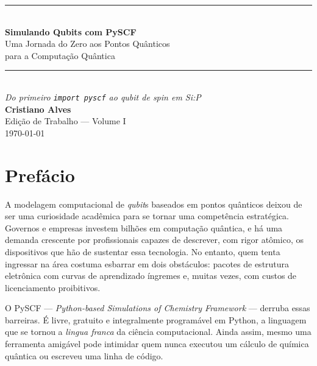 \documentclass[11pt,a4paper,openany]{book}
\newcommand{\pyscf}{\textsf{PySCF}}
\newcommand{\python}{\textsf{Python}}
\newcommand{\qubit}{\emph{qubit}}
\begin{document}
\frenchspacing

\begin{titlepage}
  \centering
  \vspace*{2.5cm}
  {\color{azulpyscf}\rule{\textwidth}{2pt}}\\[0.6cm]
  {\Huge\sffamily\bfseries\color{azulpyscf}
   Simulando Qubits com \pyscf}\\[0.4cm]
  {\LARGE\sffamily Uma Jornada do Zero aos Pontos Quânticos\\
   para a Computação Quântica}\\[0.4cm]
  {\color{azulpyscf}\rule{\textwidth}{2pt}}\\[1.5cm]

  {\Large\itshape Do primeiro \texttt{import pyscf} ao \qubit{} de spin em Si:P}\\[3cm]

  {\LARGE\sffamily\bfseries Cristiano Alves}\\[1cm]

  \vfill
  {\large Edição de Trabalho --- Volume I}\\[0.3cm]
  {\large \today}
\end{titlepage}

\frontmatter
\pagestyle{plain}

\chapter*{Prefácio}

A modelagem computacional de \qubit{}s baseados em pontos quânticos deixou de
ser uma curiosidade acadêmica para se tornar uma competência estratégica.
Governos e empresas investem bilhões em computação quântica, e há uma demanda
crescente por profissionais capazes de descrever, com rigor atômico, os
dispositivos que hão de sustentar essa tecnologia. No entanto, quem tenta
ingressar na área costuma esbarrar em dois obstáculos: pacotes de estrutura
eletrônica com curvas de aprendizado íngremes e, muitas vezes, com custos de
licenciamento proibitivos.

O \pyscf{} --- \emph{Python-based Simulations of Chemistry Framework} --- derruba
essas barreiras. É livre, gratuito e integralmente programável em \python{}, a
linguagem que se tornou a \emph{lingua franca} da ciência computacional. Ainda
assim, mesmo uma ferramenta amigável pode intimidar quem nunca executou um
cálculo de química quântica ou escreveu uma linha de código.
\end{document}
